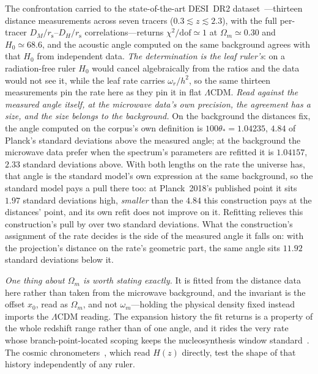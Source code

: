 \documentclass[11pt,a4paper]{article}
\theoremstyle{plain}
\theoremstyle{definition}
\theoremstyle{remark}
\newcommand{\rs}{r_{\mathrm{s}}}
\begin{document}
The confrontation carried to the state-of-the-art DESI~DR2 dataset~\cite{DESI2025}---thirteen distance
measurements across seven tracers ($0.3\lesssim z\lesssim2.3$), with the full per-tracer
$D_M/\rs$--$D_H/\rs$ correlations---returns $\chi^2/\text{dof}\simeq1$ at $\Omega_m\simeq0.30$ and
$H_0\simeq68.6$, and the acoustic angle computed on the same background
agrees with that $H_0$ from independent data. \emph{The determination is the leaf ruler's}: on a
radiation-free ruler $H_0$ would cancel algebraically from the ratios and the data would not see it, while the
leaf rate carries $\omega_r/h^{2}$, so the same thirteen measurements pin the rate here as they pin it in flat
$\Lambda$CDM. \emph{Read against the measured angle itself, at the microwave data's own precision, the agreement has a size, and the size belongs to the background.}
On the background the distances fix, the angle computed on the corpus's own definition is $100\theta_*=1.04235$,
$4.84$ of Planck's standard deviations above the measured angle; at the background the microwave data prefer when
the spectrum's parameters are refitted it is $1.04157$, $2.33$ standard deviations above. With both lengths on the rate the universe has, that angle is the standard model's own expression at the same background, so the standard model pays a pull there too: at Planck~2018's published point it sits $1.97$ standard deviations high, \emph{smaller} than the $4.84$ this construction pays at the distances' point, and its own refit does not improve on it. Refitting relieves this construction's pull by over two standard deviations. What the construction's assignment of the rate decides is the side of the measured angle it falls on: with the projection's distance on the rate's geometric part, the same angle sits $11.92$ standard deviations below it.

\emph{One thing about $\Omega_m$ is worth stating exactly.} It is fitted from the distance data here rather than taken from the microwave background, and the invariant is the offset $x_{0}$, read as $\Omega_m$, and not $\omega_m$---holding the physical density fixed instead imports the $\Lambda$CDM reading. The expansion history the fit returns is a property of the whole redshift range rather than of one angle, and it rides the very rate whose branch-point-located scoping keeps the nucleosynthesis window standard~\cite{JanzenCosmogenesis}. The cosmic chronometers~\cite{Moresco2016}, which read $H(z)$ directly, test the shape of that history independently of any ruler.
\end{document}
